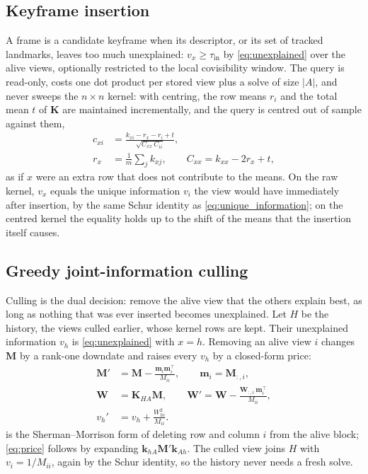 \subsection{Keyframe insertion}
\label{sec:method_insertion}

A frame is a candidate keyframe when its descriptor, or its set of tracked landmarks, leaves too much unexplained: $v_x\ge\tau_{\text{in}}$ by \cref{eq:unexplained} over the alive views, optionally restricted to the local covisibility window. The query is read-only, costs one dot product per stored view plus a solve of size $|A|$, and never sweeps the $n\times n$ kernel: with centring, the row means $r_i$ and the total mean $t$ of $\mathbf{K}$ are maintained incrementally, and the query is centred out of sample against them,
\begin{equation}
    \begin{aligned}
        c_{xi}&=\frac{k_{xi}-r_x-r_i+t}{\sqrt{C_{xx}\,C_{ii}}},\\
        r_x&=\frac{1}{m}\sum_{j}k_{xj},\qquad C_{xx}=k_{xx}-2r_x+t,
    \end{aligned}
    \label{eq:out_of_sample}
\end{equation}
as if $x$ were an extra row that does not contribute to the means. On the raw kernel, $v_x$ equals the unique information $v_i$ the view would have immediately after insertion, by the same Schur identity as \cref{eq:unique_information}; on the centred kernel the equality holds up to the shift of the means that the insertion itself causes.

\subsection{Greedy joint-information culling}
\label{sec:method_culling}

Culling is the dual decision: remove the alive view that the others explain best, as long as nothing that was ever inserted becomes unexplained. Let $H$ be the history, the views culled earlier, whose kernel rows are kept. Their unexplained information $v_h$ is \cref{eq:unexplained} with $x=h$. Removing an alive view $i$ changes $\mathbf{M}$ by a rank-one downdate and raises every $v_h$ by a closed-form price:
\begin{align}
    \mathbf{M}' &= \mathbf{M}-\frac{\mathbf{m}_i\mathbf{m}_i^{\!\top}}{M_{ii}},\qquad \mathbf{m}_i=\mathbf{M}_{:,i},
    \label{eq:downdate_M}\\
    \mathbf{W} &= \mathbf{K}_{HA}\mathbf{M},\qquad
    \mathbf{W}'=\mathbf{W}-\frac{\mathbf{W}_{:,i}\,\mathbf{m}_i^{\!\top}}{M_{ii}},
    \label{eq:downdate_W}\\
    v_h' &= v_h+\frac{W_{hi}^2}{M_{ii}}.
    \label{eq:price}
\end{align}
 is the Sherman--Morrison form of deleting row and column $i$ from the alive block; \cref{eq:price} follows by expanding $\mathbf{k}_{hA}\mathbf{M}'\mathbf{k}_{Ah}$. The culled view joins $H$ with $v_i=1/M_{ii}$, again by the Schur identity, so the history never needs a fresh solve.

